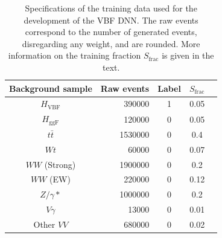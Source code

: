 \begin{table}[t]
    \centering
    \small
    \begin{tabular}{ c  | r c c c}
        \toprule
        Background sample  & Raw events & Label & $S_\text{frac}$ \\
        \midrule
        $H_{\mathrm{VBF}}$ & 390000     & 1     & 0.05            \\
        $H_{\mathrm{ggF}}$ & 120000     & 0     & 0.05            \\
        $t\bar{t}$         & 1530000    & 0     & 0.4             \\
        $Wt$               & 60000      & 0     & 0.07            \\
        $WW$ (Strong)      & 1900000    & 0     & 0.2             \\
        $WW$ (EW)          & 220000     & 0     & 0.12            \\
        $Z/\gamma*$        & 1000000    & 0     & 0.2             \\
        $V\gamma$          & 13000      & 0     & 0.01            \\
        Other $VV$         & 680000     & 0     & 0.02            \\
        \bottomrule
    \end{tabular}
    \caption[Specifications of the training data used for the DNN development.]{Specifications of the training data used for the development of the VBF DNN. The raw events correspond to the number of generated events, disregarding any weight, and are rounded. More information on the training fraction $S_\text{frac}$ is given in the text.}
    \label{tab:DNNtrainingstats}
\end{table}
